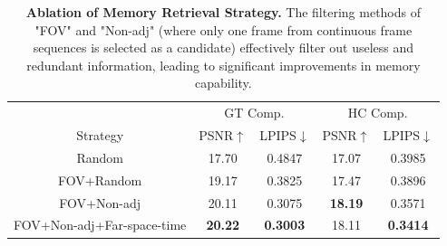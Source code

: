 


\begin{table}[t]

\tabcolsep=0.09cm
\center
\begin{tabular}{c | c c | c c }
\toprule
& \multicolumn{2}{c}{GT Comp.} & \multicolumn{2}{c}{HC Comp.}\\
  Strategy  & PSNR$\uparrow$ & LPIPS$\downarrow$ & PSNR$\uparrow$ & LPIPS$\downarrow$   \\
  \hline
  \hline
Random & 17.70 & 0.4847 & 17.07 & 0.3985 \\
  FOV+Random & 19.17 & 0.3825 & 17.47 & 0.3896 \\
  FOV+Non-adj & 20.11 & 0.3075 & \textbf{18.19} & 0.3571 \\
  FOV+Non-adj+Far-space-time & \textbf{20.22} & \textbf{0.3003} & 18.11 & \textbf{0.3414} \\

\bottomrule

\end{tabular}
\caption{\textbf{Ablation of Memory Retrieval Strategy.} The filtering methods of "FOV" and "Non-adj" (where only one frame from continuous frame sequences is selected as a candidate) effectively filter out useless and redundant information, leading to significant improvements in memory capability.}
\vspace{-0.6cm}
\label{table:ablation_retrieval}
\end{table}
